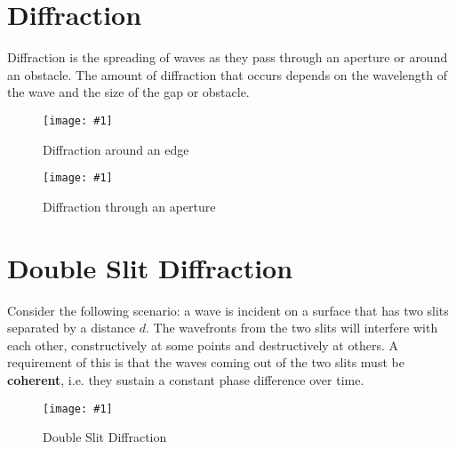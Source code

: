 \documentclass[a4paper,12pt]{article}
\let\oldsection\section
\renewcommand\section{\clearpage\oldsection}
\newcommand{\img}[4]{\begin{center}
  \begin{figure}[H]
    \centering
    \texttt{[image: \#1]}
    \caption{#3}
    \label{fig:#4}
  \end{figure}
\end{center}}
\begin{document}
\section{Diffraction}

Diffraction is the spreading of waves as they pass through an aperture or around an obstacle. The amount of diffraction that occurs depends on the wavelength of the wave and the size of the gap or obstacle.

\begin{minipage}{0.45\textwidth}
  \img{diffractionedge.png}{1}{Diffraction around an edge}{diffraction}
\end{minipage}\hspace*{0.1\textwidth}%
\begin{minipage}{0.45\textwidth}
  \img{diffractionaperture.png}{1}{Diffraction through an aperture}{diffractionaperture}
\end{minipage}


\pagebreak

\section{Double Slit Diffraction}

Consider the following scenario: a wave is incident on a surface that has two slits separated by a distance $d$. The wavefronts from the two slits will interfere with each other, constructively at some points and destructively at others. A requirement of this is that the waves coming out of the two slits must be \textbf{coherent}, i.e. they sustain a constant phase difference over time.

\img{doubleslit.png}{0.46}{Double Slit Diffraction}{doubleslit}
\end{document}
